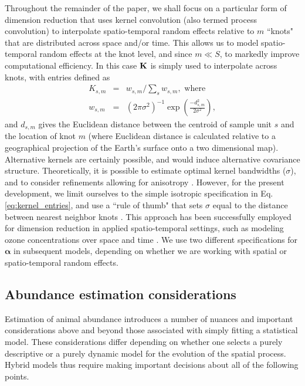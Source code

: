 \documentclass[12pt,english]{article}
\begin{document}
\begin{spacing}{1.9}
Throughout the remainder of the paper, we shall focus on a particular form of dimension reduction that uses kernel convolution (also termed process convolution) \citep[][]{BarryVerHoef1996,Higdon1998} to interpolate spatio-temporal random effects relative to $m$ ``knots" that are distributed across space and/or time.  This allows us to model spatio-temporal random effects at the knot level, and since $m \ll S$, to markedly improve computational efficiency.  In this case ${\bf K}$ is simply used to interpolate across knots, with entries defined as
\begin{eqnarray}
   K_{s,m} & = & w_{s,m}/\sum_s{w_{s,m}}, \text{ where} \\
   w_{s,m} & = & (2 \pi \sigma^2)^{-1} \exp(\frac{-d_{s,m}^2}{2 \sigma^2}),
   \label{eq:kernel_entries}
\end{eqnarray}
and $d_{s,m}$ gives the Euclidean distance between the centroid of sample unit $s$ and the location of knot $m$ (where Euclidean distance is calculated relative to a geographical projection of the Earth's surface onto a two dimensional map).  Alternative kernels are certainly possible, and would induce alternative covariance structure.  Theoretically, it is possible to estimate optimal kernel bandwidths ($\sigma$), and to consider refinements allowing for anisotropy \citep{Higdon1998}.  However, for the present development, we limit ourselves to the simple isotropic specification in Eq. \ref{eq:kernel_entries}, and use a ``rule of thumb" that sets $\sigma$ equal to the distance between nearest neighbor knots \citep{Higdon2002}.
This approach has been successfully employed for dimension reduction in applied spatio-temporal settings, such as modeling ozone concentrations over space and time \citep{CalderEtAl2002,Higdon2002}.  We use two different specifications for $\boldsymbol{\alpha}$ in subsequent models, depending on whether we are working with spatial or spatio-temporal random effects.


\subsection{Abundance estimation considerations}

Estimation of animal abundance introduces a number of nuances and important considerations above and beyond those associated with simply fitting a statistical model.  These considerations differ depending on whether one selects a purely descriptive or a purely dynamic model for the evolution of the spatial process. Hybrid models thus require making important decisions about all of the following points.


\end{spacing}
\end{document}
